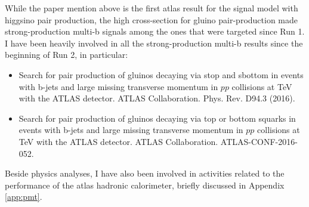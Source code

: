 While the paper mention above is the first \gls{atlas} result for the signal model with higgsino pair production, 
the high cross-section for gluino pair-production made strong-production multi-b signals among the ones that were targeted since Run 1. 
I have been heavily involved in all the strong-production multi-b results since the beginning of Run 2, in particular:

\begin{itemize}
\item Search for pair production of gluinos decaying via stop and sbottom in events with b-jets and large missing transverse momentum in $pp$ collisions at \cmtre TeV with the ATLAS detector. ATLAS Collaboration. Phys. Rev. D94.3 (2016).
\item Search for pair production of gluinos decaying via top or bottom squarks in events with b-jets and large missing transverse momentum in
$pp$ collisions at \cmtre TeV with the ATLAS detector. ATLAS Collaboration. ATLAS-CONF-2016-052.
\end{itemize}

Beside physics analyses, I have also been involved in activities related to the performance of the \gls{atlas} hadronic calorimeter, 
briefly discussed in Appendix \ref{app:pmt}.


